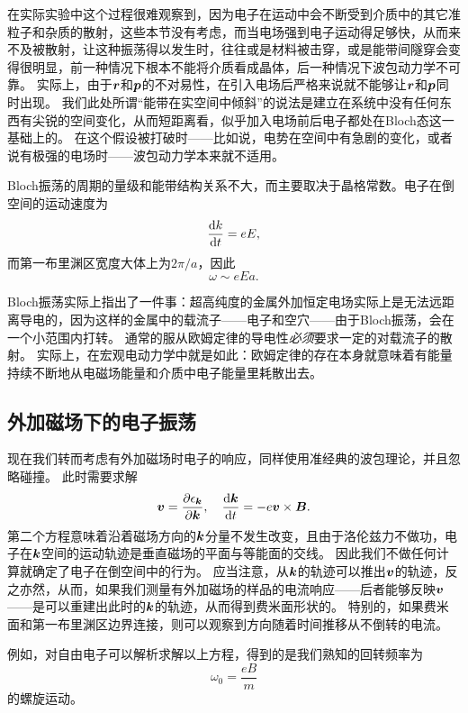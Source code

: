 在实际实验中这个过程很难观察到，因为电子在运动中会不断受到介质中的其它准粒子和杂质的散射，这些本节没有考虑，而当电场强到电子运动得足够快，从而来不及被散射，让这种振荡得以发生时，往往或是材料被击穿，或是能带间隧穿会变得很明显，前一种情况下根本不能将介质看成晶体，后一种情况下波包动力学不可靠。
实际上，由于$\vb*{r}$和$\vb*{p}$的不对易性，在引入电场后严格来说就不能够让$\vb*{r}$和$\vb*{p}$同时出现。
我们此处所谓“能带在实空间中倾斜”的说法是建立在系统中没有任何东西有尖锐的空间变化，从而短距离看，似乎加入电场前后电子都处在Bloch态这一基础上的。
在这个假设被打破时——比如说，电势在空间中有急剧的变化，或者说有极强的电场时——波包动力学本来就不适用。

Bloch振荡的周期的量级和能带结构关系不大，而主要取决于晶格常数。电子在倒空间的运动速度为
\[
    \dv{k}{t} = e E,
\]
而第一布里渊区宽度大体上为$2 \pi / a$，因此
\begin{equation}
    \omega \sim e E a.
\end{equation}

Bloch振荡实际上指出了一件事：超高纯度的金属外加恒定电场实际上是无法远距离导电的，因为这样的金属中的载流子——电子和空穴——由于Bloch振荡，会在一个小范围内打转。
通常的服从欧姆定律的导电性\emph{必须}要求一定的对载流子的散射。
实际上，在宏观电动力学中就是如此：欧姆定律的存在本身就意味着有能量持续不断地从电磁场能量和介质中电子能量里耗散出去。

\subsection{外加磁场下的电子振荡}

现在我们转而考虑有外加磁场时电子的响应，同样使用准经典的波包理论，并且忽略碰撞。
此时需要求解
\begin{equation}
    \vb*{v} = \pdv{\epsilon_{\vb*{k}}}{\vb*{k}}, \quad \dv{\vb*{k}}{t} = -e \vb*{v} \times \vb*{B}.
    \label{eq:calssical-magnetic-field}
\end{equation}
第二个方程意味着沿着磁场方向的$\vb*{k}$分量不发生改变，且由于洛伦兹力不做功，电子在$\vb*{k}$空间的运动轨迹是垂直磁场的平面与等能面的交线。
因此我们不做任何计算就确定了电子在倒空间中的行为。
应当注意，从$\vb*{k}$的轨迹可以推出$\vb*{v}$的轨迹，反之亦然，从而，如果我们测量有外加磁场的样品的电流响应——后者能够反映$\vb*{v}$——是可以重建出此时的$\vb*{k}$的轨迹，从而得到费米面形状的。
特别的，如果费米面和第一布里渊区边界连接，则可以观察到方向随着时间推移从不倒转的电流。

例如，对自由电子可以解析求解以上方程，得到的是我们熟知的回转频率为
\begin{equation}
    \omega_0 = \frac{e B}{m}
\end{equation}
的螺旋运动。

